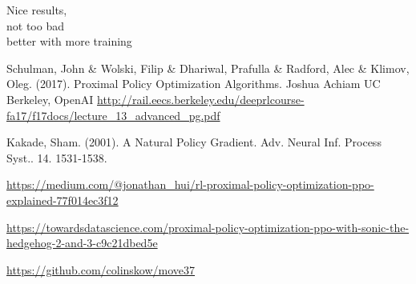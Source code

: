 \documentclass[12pt,a4paper]{article}
\begin{document}
Nice results, \\
not too bad \\
better with more training

\begin{thebibliography}{1}

 Schulman, John \& Wolski, Filip \& Dhariwal, Prafulla \& Radford, Alec \& Klimov, Oleg. (2017). Proximal Policy Optimization Algorithms. 
 Joshua Achiam UC Berkeley, OpenAI \url{http://rail.eecs.berkeley.edu/deeprlcourse-fa17/f17docs/lecture_13_advanced_pg.pdf}

 Kakade, Sham. (2001). A Natural Policy Gradient. Adv. Neural Inf. Process Syst.. 14. 1531-1538. 

 \url{https://medium.com/@jonathan_hui/rl-proximal-policy-optimization-ppo-explained-77f014ec3f12}

 \url{https://towardsdatascience.com/proximal-policy-optimization-ppo-with-sonic-the-hedgehog-2-and-3-c9c21dbed5e}

 \url{https://github.com/colinskow/move37}
\end{thebibliography}
\end{document}
